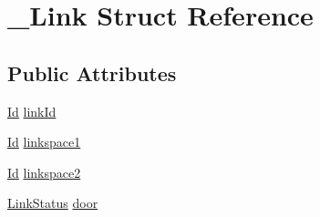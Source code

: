 \hypertarget{struct__Link}{\section{\+\_\+\+Link Struct Reference}
\label{struct__Link}
}
\subsection*{Public Attributes}
\begin{DoxyCompactItemize}
\item 
\hyperlink{types_8h_a845e604fb28f7e3d97549da3448149d3}{Id} \hyperlink{struct__Link_a3c2eb94d5f272bf373c113a868e3d367}{link\+Id}
\item 
\hyperlink{types_8h_a845e604fb28f7e3d97549da3448149d3}{Id} \hyperlink{struct__Link_a851b2cb675c25aaa73ebbaa58b8db1a2}{linkspace1}
\item 
\hyperlink{types_8h_a845e604fb28f7e3d97549da3448149d3}{Id} \hyperlink{struct__Link_aac79e76abc5512cd08a381eb835d59f0}{linkspace2}
\item 
\hyperlink{types_8h_aa60f669816b146d6373c62d9625e52ad}{Link\+Status} \hyperlink{struct__Link_ab4d6f65f126e9a41440828d2317b7a79}{door}
\end{DoxyCompactItemize}


